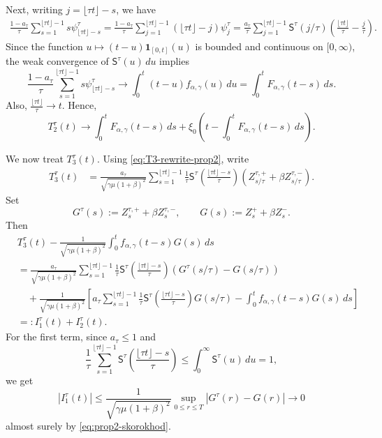 \documentclass[letterpaper]{article}
\numberwithin{equation}{section}
\theoremstyle{definition}
\theoremstyle{remark}
\begin{document}
Next, writing $j=\lfloor \tau t\rfloor-s$, we have
\begin{align*}
  \frac{1-a_\tau}{\tau}
  \sum_{s=1}^{\lfloor \tau t\rfloor-1}s\psi_{\lfloor \tau t\rfloor-s}^\tau
  =
  \frac{1-a_\tau}{\tau}
  \sum_{j=1}^{\lfloor \tau t\rfloor-1}
  (\lfloor \tau t\rfloor-j)\psi_j^\tau
 =
  \frac{a_\tau}{\tau}
  \sum_{j=1}^{\lfloor \tau t\rfloor-1}
  \mathsf S^\tau(j/\tau)
  \left(\frac{\lfloor \tau t\rfloor}{\tau}-\frac{j}{\tau}\right).
\end{align*}
Since the function
$u\mapsto (t-u)\mathbf 1_{[0,t]}(u)$
is bounded and continuous on $[0,\infty)$, the weak convergence of
$\mathsf S^\tau(u)\,du$ implies
\[
  \frac{1-a_\tau}{\tau}
  \sum_{s=1}^{\lfloor \tau t\rfloor-1}s\psi_{\lfloor \tau t\rfloor-s}^\tau
  \to
  \int_0^t (t-u)f_{\alpha,\gamma}(u)\,du
  =
  \int_0^t F_{\alpha,\gamma}(t-s)\,ds.
\]
Also,
$\frac{\lfloor \tau t\rfloor}{\tau}\to t$.
Hence,
\begin{equation}\label{eq:T2-limit-prop2}
  T_2^\tau(t)
  \to
  \int_0^t F_{\alpha,\gamma}(t-s)\,ds
  +
  \xi_0\left(
    t-\int_0^t F_{\alpha,\gamma}(t-s)\,ds
  \right).
\end{equation}

We now treat $T_3^\tau(t)$. Using \eqref{eq:T3-rewrite-prop2}, write
\begin{align*}
  T_3^\tau(t)
  &=
  \frac{a_\tau}{\sqrt{\gamma\mu(1+\beta)^2}}
  \sum_{s=1}^{\lfloor \tau t\rfloor-1}
  \frac1{\tau}
  \mathsf S^\tau\!\left(\frac{\lfloor \tau t\rfloor-s}{\tau}\right)
  \left(
    Z_{s/\tau}^{\tau,+}+\beta Z_{s/\tau}^{\tau,-}
  \right).
\end{align*}
Set
\[
  G^\tau(s):=Z_s^{\tau,+}+\beta Z_s^{\tau,-},
  \qquad
  G(s):=Z_s^++\beta Z_s^-.
\]
Then
\begin{align*}
  &T_3^\tau(t)
  -
  \frac1{\sqrt{\gamma\mu(1+\beta)^2}}
  \int_0^t f_{\alpha,\gamma}(t-s)G(s)\,ds
  \\
  &=
  \frac{a_\tau}{\sqrt{\gamma\mu(1+\beta)^2}}
  \sum_{s=1}^{\lfloor \tau t\rfloor-1}
  \frac1{\tau}
  \mathsf S^\tau\!\left(\frac{\lfloor \tau t\rfloor-s}{\tau}\right)
  \left(G^\tau(s/\tau)-G(s/\tau)\right)
  \\
  &\quad
  +
  \frac{1}{\sqrt{\gamma\mu(1+\beta)^2}}
  \left[
    a_\tau
    \sum_{s=1}^{\lfloor \tau t\rfloor-1}
    \frac1{\tau}
    \mathsf S^\tau\!\left(\frac{\lfloor \tau t\rfloor-s}{\tau}\right)
    G(s/\tau)
    -
    \int_0^t f_{\alpha,\gamma}(t-s)G(s)\,ds
  \right]
  \\
  &=:I_1^\tau(t)+I_2^\tau(t).
\end{align*}
For the first term, since $a_\tau\le1$ and
\[
  \frac1{\tau}\sum_{s=1}^{\lfloor \tau t\rfloor-1}
  \mathsf S^\tau\!\left(\frac{\lfloor \tau t\rfloor-s}{\tau}\right)
  \le
  \int_0^\infty \mathsf S^\tau(u)\,du
  =1,
\]
we get
\[
  |I_1^\tau(t)|
  \le
  \frac{1}{\sqrt{\gamma\mu(1+\beta)^2}}
  \sup_{0\le r\le T}|G^\tau(r)-G(r)|
  \to0
\]
almost surely by \eqref{eq:prop2-skorokhod}.
\end{document}
